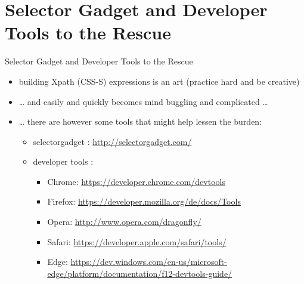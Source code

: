 \documentclass[ignorenonframetext,]{beamer}
\providecommand{\tightlist}{%
  \setlength{\itemsep}{0pt}\setlength{\parskip}{0pt}}
\begin{document}
\section{Selector Gadget and Developer Tools to the
Rescue}\label{selector-gadget-and-developer-tools-to-the-rescue}

\begin{frame}{Selector Gadget and Developer Tools to the Rescue}

\begin{itemize}
\tightlist
\item
  building Xpath (CSS-S) expressions is an art (practice hard and be
  creative)
\item
  \ldots{} and easily and quickly becomes mind buggling and complicated
  \ldots{}
\item
  \ldots{} there are however some tools that might help lessen the
  burden:

  \begin{itemize}
  \tightlist
  \item
    selectorgadget : \url{http://selectorgadget.com/}
  \item
    developer tools :

    \begin{itemize}
    \tightlist
    \item
      Chrome: \url{https://developer.chrome.com/devtools}
    \item
      Firefox: \url{https://developer.mozilla.org/de/docs/Tools}
    \item
      Opera: \url{http://www.opera.com/dragonfly/}
    \item
      Safari: \url{https://developer.apple.com/safari/tools/}
    \item
      Edge:
      \url{https://dev.windows.com/en-us/microsoft-edge/platform/documentation/f12-devtools-guide/}
    \end{itemize}
  \end{itemize}
\end{itemize}

\end{frame}
\end{document}
